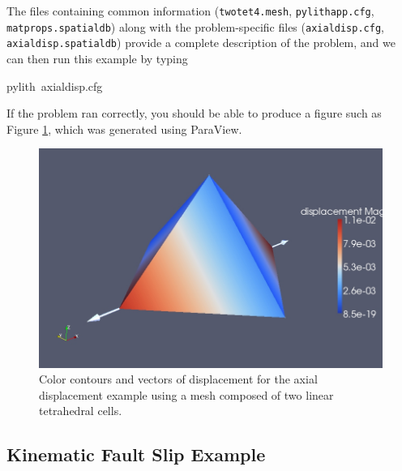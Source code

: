 The files containing common information (\texttt{twotet4.mesh}, \texttt{pylithapp.cfg},
\texttt{matprops.spatialdb}) along with the problem-specific files
(\texttt{axialdisp.cfg}, \texttt{axialdisp.spatialdb}) provide a complete
description of the problem, and we can then run this example by typing
\begin{lyxcode}
pylith~axialdisp.cfg
\end{lyxcode}
If the problem ran correctly, you should be able to produce a figure
such as Figure \ref{fig:twotet4-axial}, which was generated using
ParaView.

\begin{figure}
\begin{centering}
\includegraphics[scale=0.33]{tutorials/twocells/figs/twotet4-axialdisp}
\par\end{centering}

\caption{Color contours and vectors of displacement for the axial displacement
example using a mesh composed of two linear tetrahedral cells.\label{fig:twotet4-axial}}
\end{figure}



\subsection{Kinematic Fault Slip Example}

